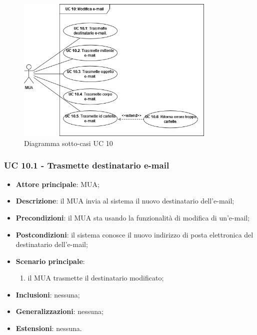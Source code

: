     \begin{figure}[H]
        \includegraphics[width=0.85\textwidth]{sections/uc_imgs/UC10.png}
        \centering
        \caption{Diagramma sotto-casi UC 10}
    \end{figure}

    \subsubsection{UC 10.1 - Trasmette destinatario e-mail} \label{sec:UC10.1}
    \begin{itemize}
        \item \textbf{Attore principale}: MUA;
        \item \textbf{Descrizione}: il MUA invia al sistema il nuovo destinatario dell'e-mail;
        \item \textbf{Precondizioni}: il MUA sta usando la funzionalità di modifica di un'e-mail;
        \item \textbf{Postcondizioni}: il sistema conosce il nuovo indirizzo di posta elettronica del destinatario dell'e-mail;
        \item \textbf{Scenario principale}:
            \begin{enumerate}
                \item il MUA trasmette il destinatario modificato;
            \end{enumerate}
        \item \textbf{Inclusioni}: nessuna;
        \item \textbf{Generalizzazioni}: nessuna;
        \item \textbf{Estensioni}: nessuna.
    \end{itemize}

